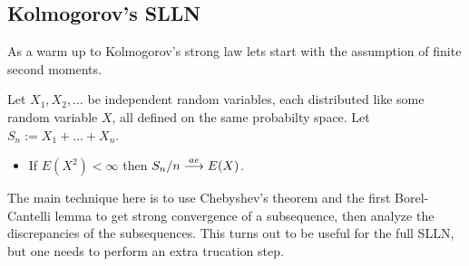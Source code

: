 %
%
\subsection{Kolmogorov's SLLN}



As a warm up to Kolmogorov's strong law lets start with the assumption of finite second moments. 
\begin{theorem}
\label{L2 SLLN}
Let $X_1, X_2,\ldots$ be independent random variables, each distributed like some random variable $X$, all defined on the same probabilty space. Let $S_n:= X_1+\ldots+ X_n$. 
\begin{itemize}
\item If $E(X^2)<\infty$ then $S_n/n \overset{\small ae} \longrightarrow E(X)$.
\end{itemize}
\end{theorem}
The main technique here is to use Chebyshev's theorem and the first Borel-Cantelli lemma to get strong convergence of a subsequence, then analyze the discrepancies of the subsequences. This turns out to be useful for the full SLLN, but one needs to perform an extra trucation step.
